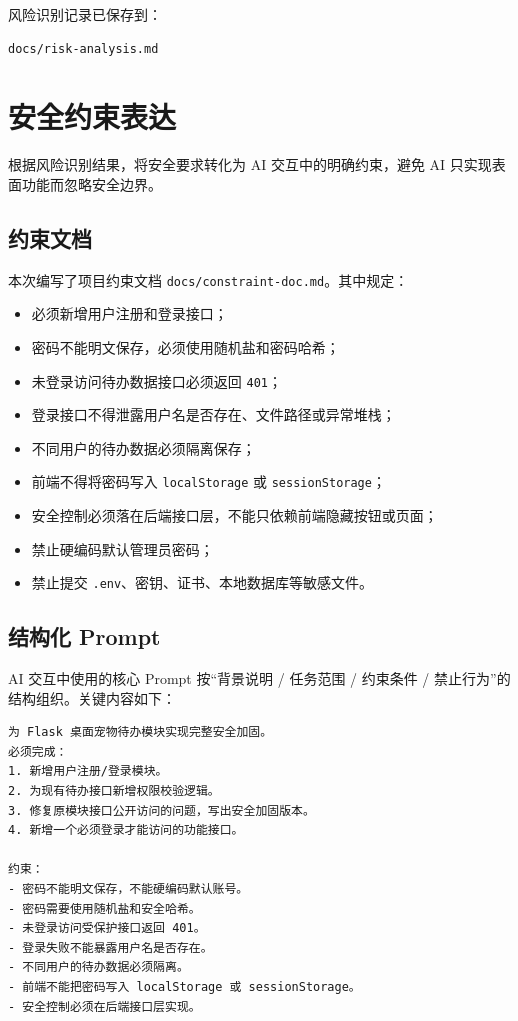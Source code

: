 \documentclass[12pt,a4paper]{ctexart}
\begin{document}
风险识别记录已保存到：

\begin{verbatim}
docs/risk-analysis.md
\end{verbatim}

\section{安全约束表达}

根据风险识别结果，将安全要求转化为 AI 交互中的明确约束，避免 AI 只实现表面功能而忽略安全边界。

\subsection{约束文档}

本次编写了项目约束文档 \texttt{docs/constraint-doc.md}。其中规定：

\begin{itemize}[leftmargin=2.5em]
    \item 必须新增用户注册和登录接口；
    \item 密码不能明文保存，必须使用随机盐和密码哈希；
    \item 未登录访问待办数据接口必须返回 \texttt{401}；
    \item 登录接口不得泄露用户名是否存在、文件路径或异常堆栈；
    \item 不同用户的待办数据必须隔离保存；
    \item 前端不得将密码写入 \texttt{localStorage} 或 \texttt{sessionStorage}；
    \item 安全控制必须落在后端接口层，不能只依赖前端隐藏按钮或页面；
    \item 禁止硬编码默认管理员密码；
    \item 禁止提交 \texttt{.env}、密钥、证书、本地数据库等敏感文件。
\end{itemize}

\subsection{结构化 Prompt}

AI 交互中使用的核心 Prompt 按“背景说明 / 任务范围 / 约束条件 / 禁止行为”的结构组织。关键内容如下：

\begin{verbatim}
为 Flask 桌面宠物待办模块实现完整安全加固。
必须完成：
1. 新增用户注册/登录模块。
2. 为现有待办接口新增权限校验逻辑。
3. 修复原模块接口公开访问的问题，写出安全加固版本。
4. 新增一个必须登录才能访问的功能接口。

约束：
- 密码不能明文保存，不能硬编码默认账号。
- 密码需要使用随机盐和安全哈希。
- 未登录访问受保护接口返回 401。
- 登录失败不能暴露用户名是否存在。
- 不同用户的待办数据必须隔离。
- 前端不能把密码写入 localStorage 或 sessionStorage。
- 安全控制必须在后端接口层实现。
\end{verbatim}
\end{document}
